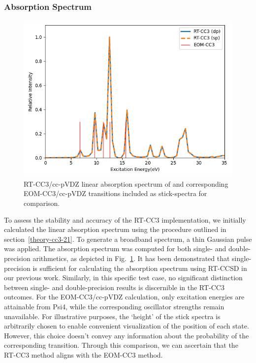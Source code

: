 \subsubsection{Absorption Spectrum}\label{results-cc3-21}
\begin{figure}
    \centering
    \includegraphics[angle=0, scale=0.43]{ch4/Figs/1-1.png}
    \caption{RT-CC3/cc-pVDZ linear absorption spectrum of  and corresponding EOM-CC3/cc-pVDZ transitions included as stick-spectra for comparison.}
    \label{fig:abs-water}
\end{figure}
To assess the stability and accuracy of the RT-CC3 implementation, we initially calculated the linear absorption spectrum using the procedure outlined in section~\ref{theory-cc3-21}. To generate a broadband spectrum, a thin Gaussian pulse was applied. The absorption spectrum was computed for both single- and double-precision arithmetics, as depicted in Fig.~\ref{fig:abs-water}. It has been demonstrated that single-precision is sufficient for calculating the absorption spectrum using RT-CCSD in our previous work.\cite{Wang2022} Similarly, in this specific test case, no significant distinction between single- and double-precision results is discernible in the RT-CC3 outcomes. For the EOM-CC3/cc-pVDZ calculation, only excitation energies are attainable from Psi4, while the corresponding oscillator strengths remain unavailable. For illustrative purposes, the `height' of the stick spectra is arbitrarily chosen to enable convenient visualization of the position of each state. However, this choice doesn't convey any information about the probability of the corresponding transition. Through this comparison, we can ascertain that the RT-CC3 method aligns with the EOM-CC3 method.

